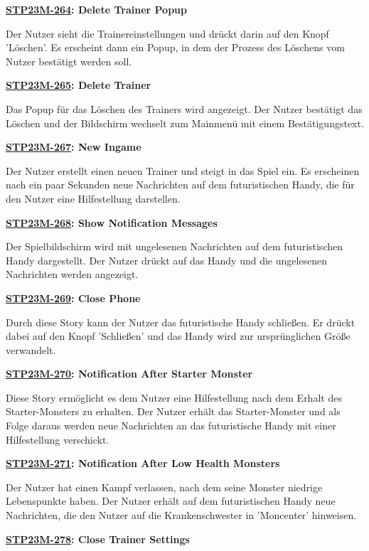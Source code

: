 \textbf{\hyperlink{T264}{\hypertarget{S264}{STP23M-264}}: Delete Trainer Popup}

Der Nutzer sieht die Trainereinstellungen und drückt darin auf den Knopf 'Löschen'. Es erscheint dann ein Popup, in dem der Prozess des Löschens vom Nutzer bestätigt werden soll.

\textbf{\hyperlink{T265}{\hypertarget{S265}{STP23M-265}}: Delete Trainer}

Das Popup für das Löschen des Trainers wird angezeigt. Der Nutzer bestätigt das Löschen und der Bildschirm wechselt zum Mainmenü mit einem Bestätigungstext.

\textbf{\hyperlink{T267}{\hypertarget{S267}{STP23M-267}}: New Ingame}

Der Nutzer erstellt einen neuen Trainer und steigt in das Spiel ein. Es erscheinen nach ein paar Sekunden neue Nachrichten auf dem futuristischen Handy, die für den Nutzer eine Hilfestellung darstellen. 

\textbf{\hyperlink{T268}{\hypertarget{S268}{STP23M-268}}: Show Notification Messages}

Der Spielbildschirm wird mit ungelesenen Nachrichten auf dem futuristischen Handy dargestellt. Der Nutzer drückt auf das Handy und die ungelesenen Nachrichten werden angezeigt.

\textbf{\hyperlink{T269}{\hypertarget{S269}{STP23M-269}}: Close Phone}

Durch diese Story kann der Nutzer das futuristische Handy schließen. Er drückt dabei auf den Knopf 'Schließen' und das Handy wird zur ursprünglichen Größe verwandelt. 

\textbf{\hyperlink{T270}{\hypertarget{S270}{STP23M-270}}: Notification After Starter Monster}

Diese Story ermöglicht es dem Nutzer eine Hilfestellung nach dem Erhalt des Starter-Monsters zu erhalten. Der Nutzer erhält das Starter-Monster und als Folge daraus werden neue Nachrichten an das futuristische Handy mit einer Hilfestellung verschickt.

\textbf{\hyperlink{T271}{\hypertarget{S271}{STP23M-271}}: Notification After Low Health Monsters}

Der Nutzer hat einen Kampf verlassen, nach dem seine Monster niedrige Lebenspunkte haben. Der Nutzer erhält auf dem futuristischen Handy neue Nachrichten, die den Nutzer auf die Krankenschwester in 'Moncenter' hinweisen.

\textbf{\hyperlink{T278}{\hypertarget{S278}{STP23M-278}}: Close Trainer Settings}

